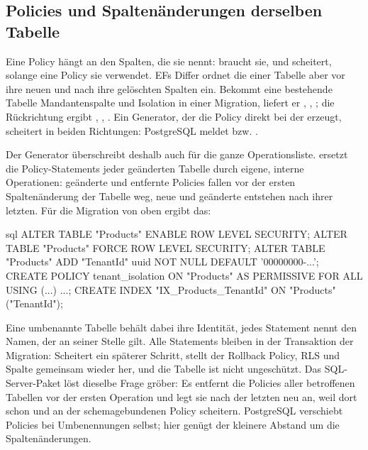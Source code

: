 \subsection*{Policies und Spaltenänderungen derselben Tabelle}

Eine Policy hängt an den Spalten, die sie nennt:  braucht sie, und
 scheitert, solange eine Policy sie verwendet. EFs Differ ordnet die
 einer Tabelle aber vor ihre neuen und
nach ihre gelöschten Spalten ein. Bekommt eine bestehende Tabelle Mandantenspalte und Isolation
in einer Migration, liefert er , ,
; die Rückrichtung ergibt ,
, . Ein Generator, der die Policy
direkt bei der  erzeugt, scheitert in
beiden Richtungen: PostgreSQL meldet  bzw. .

Der Generator überschreibt deshalb auch  für die ganze Operationsliste.
 ersetzt die Policy-Statements jeder
geänderten Tabelle durch eigene, interne Operationen: geänderte und entfernte Policies fallen vor
der ersten Spaltenänderung der Tabelle weg, neue und geänderte entstehen nach ihrer letzten.
Für die Migration von oben ergibt das:

\begin{sourcecode}{sql}
ALTER TABLE "Products" ENABLE ROW LEVEL SECURITY;
ALTER TABLE "Products" FORCE ROW LEVEL SECURITY;
ALTER TABLE "Products" ADD "TenantId" uuid NOT NULL DEFAULT '00000000-...';
CREATE POLICY tenant_isolation ON "Products" AS PERMISSIVE FOR ALL USING (...) ...;
CREATE INDEX "IX_Products_TenantId" ON "Products" ("TenantId");
\end{sourcecode}

Eine umbenannte Tabelle behält dabei ihre Identität, jedes Statement nennt den Namen, der an
seiner Stelle gilt. Alle Statements bleiben in der Transaktion der Migration: Scheitert ein
späterer Schritt, stellt der Rollback Policy, RLS und Spalte gemeinsam wieder her, und die
Tabelle ist nicht ungeschützt. Das SQL-Server-Paket löst dieselbe Frage gröber: Es entfernt die
Policies aller betroffenen Tabellen vor der ersten Operation und legt sie nach der letzten neu
an, weil dort schon  und  an der schemagebundenen Policy
scheitern. PostgreSQL verschiebt Policies bei Umbenennungen selbst; hier genügt der kleinere
Abstand um die Spaltenänderungen.

